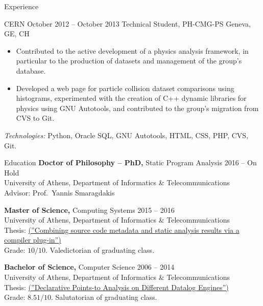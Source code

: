 \documentclass{resume}
\begin{document}
\begin{rSection}{Experience}
\begin{rSubsection}
  {CERN}
  {October 2012 -- October 2013}
  {Technical Student, PH-CMG-PS}
  {Geneva, GE, CH}

  \begin{itemize}[label={-}]
    \setlength\itemsep{-0.5em}
    \item Contributed to the active development of a physics analysis framework, in particular to the production of datasets and management of the group's database.
    \item Developed a web page for particle collision dataset comparisons using histograms, experimented with the creation of C++ dynamic libraries for physics using GNU Autotools, and contributed to the group's migration from CVS to Git.
  \end{itemize}
  \footnotesize\textcolor{TechsColor}{\textit{Technologies:} Python, Oracle SQL, GNU Autotools, HTML, CSS, PHP, CVS, Git.}\\
\end{rSubsection}
\end{rSection}

\begin{rSection}{Education}
  {\bf Doctor of Philosophy -- PhD,} Static Program Analysis \hfill {2016 -- On Hold } \\
  University of Athens,  Department of Informatics \& Telecommunications \\
  Advisor: Prof.~Yannis Smaragdakis

  {\bf Master of Science,} Computing Systems \hfill {2015 -- 2016 } \\
  University of Athens,  Department of Informatics \& Telecommunications \\
  Thesis: \href{http://cgi.di.uoa.gr/~smaragd/theses/antoniadis2.pdf}{ (''Combining source code metadata and static analysis results via a compiler plug-in'')} \\
  Grade: $10 / 10$. Valedictorian of graduating class.

  {\bf Bachelor of Science,}  Computer Science \hfill {2006 -- 2014}  \\
  University of Athens,  Department of Informatics \& Telecommunications \\
  Thesis: \href{http://cgi.di.uoa.gr/~smaragd/theses/antoniadis.pdf}{ (''Declarative Points-to Analysis on Different Datalog Engines'')} \\
  Grade: $8.51 / 10$. Salutatorian of graduating class.
\end{rSection}
\end{document}
